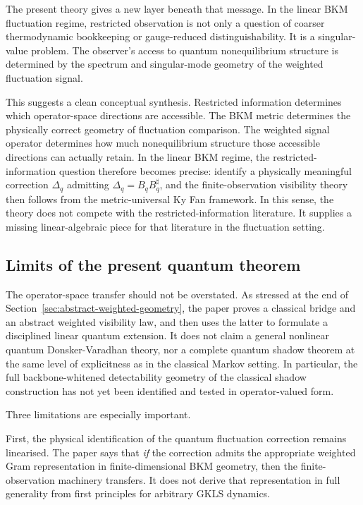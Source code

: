 \documentclass[11pt,a4paper]{article}
\numberwithin{equation}{section}
\theoremstyle{thmcompact}
\theoremstyle{remark}
\begin{document}
The present theory gives a new layer beneath that message. In the linear BKM fluctuation regime, restricted observation is not only a question of coarser thermodynamic bookkeeping or gauge-reduced distinguishability. It is a singular-value problem. The observer's access to quantum nonequilibrium structure is determined by the spectrum and singular-mode geometry of the weighted fluctuation signal.

This suggests a clean conceptual synthesis. Restricted information determines which operator-space directions are accessible. The BKM metric determines the physically correct geometry of fluctuation comparison. The weighted signal operator determines how much nonequilibrium structure those accessible directions can actually retain. In the linear BKM regime, the restricted-information question therefore becomes precise: identify a physically meaningful correction \(\Delta_q\) admitting \(\Delta_q=B_qB_q^{\sharp}\), and the finite-observation visibility theory then follows from the metric-universal Ky Fan framework. In this sense, the theory does not compete with the restricted-information literature. It supplies a missing linear-algebraic piece for that literature in the fluctuation setting.

\subsection{Limits of the present quantum theorem}

The operator-space transfer should not be overstated. As stressed at the end of Section~\ref{sec:abstract-weighted-geometry}, the paper proves a classical bridge and an abstract weighted visibility law, and then uses the latter to formulate a disciplined linear quantum extension. It does not claim a general nonlinear quantum Donsker-Varadhan theory, nor a complete quantum shadow theorem at the same level of explicitness as in the classical Markov setting. In particular, the full backbone-whitened detectability geometry of the classical shadow construction has not yet been identified and tested in operator-valued form.

Three limitations are especially important.

First, the physical identification of the quantum fluctuation correction remains linearised. The paper says that \emph{if} the correction admits the appropriate weighted Gram representation in finite-dimensional BKM geometry, then the finite-observation machinery transfers. It does not derive that representation in full generality from first principles for arbitrary GKLS dynamics.
\end{document}
